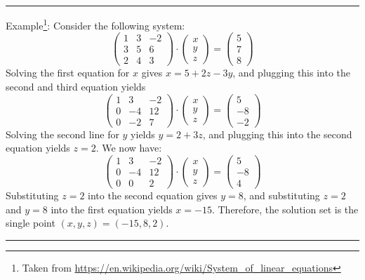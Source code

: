 \begin{center}
\begin{minipage}[t]{0.77\textwidth}
\par\noindent\rule{\textwidth}{0.4pt}
{\color{blue} Example}\footnote{Taken from \url{https://en.wikipedia.org/wiki/System_of_linear_equations}}: 
Consider the following system:
\[
\left(
\begin{array}{ccc}
1 & 3 & -2 \\
3 & 5 & 6 \\
2 & 4 & 3
\end{array}
\right)
\cdot
\left(
\begin{array}{c}
x \\ y \\ z
\end{array}
\right)
=
\left(
\begin{array}{c}
5 \\ 7 \\ 8
\end{array}
\right)
\]
Solving the first equation for $x$ gives $x = 5 + 2z - 3y$, 
and plugging this into the second and third equation yields
\[
\left(
\begin{array}{ccc}
1 & 3 & -2 \\
0 & -4 & 12 \\
0 & -2 & 7
\end{array}
\right)
\cdot
\left(
\begin{array}{c}
x \\ y \\ z
\end{array}
\right)
=
\left(
\begin{array}{c}
5 \\ -8 \\ -2 
\end{array}
\right)
\]
Solving the second line for $y$ yields $y = 2 + 3z$, 
and plugging this into the second equation yields $z = 2$. We now have: 
\[
\left(
\begin{array}{ccc}
1 & 3 & -2 \\
0 & -4 & 12 \\
0 & 0 & 2
\end{array}
\right)
\cdot
\left(
\begin{array}{c}
x \\ y \\ z
\end{array}
\right)
=
\left(
\begin{array}{c}
5 \\ -8 \\ 4
\end{array}
\right)
\]
Substituting $z = 2$ into the second equation gives $y = 8$, 
and substituting $z = 2$ and $y = 8$ into the first equation yields $x = -15$. 
Therefore, the solution set is the single point $(x, y, z) = (-15, 8, 2)$.

\par\noindent\rule{\textwidth}{0.4pt}
\end{minipage}
\end{center}

